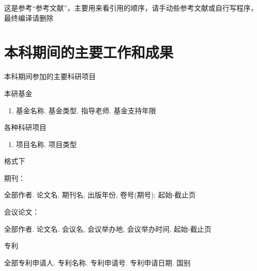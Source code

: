 \documentclass[UTF8,openany,AutoFakeBold,AutoFakeSlant,cs4size]{ctexbook}
\begin{document}
{
	\fancyhf{}
	\fancyfoot[CO,CE]{~\thepage~}
	\renewcommand{\headrulewidth}{0.7pt}
	\renewcommand{\footrulewidth}{0pt}
}
\fancyhf{}
\fancyfoot[CO,CE]{~\thepage~}
\renewcommand{\headrulewidth}{0.7pt}
\renewcommand{\footrulewidth}{0pt}








这是参考“参考文献”，主要用来看引用的顺序，请手动些参考文献或自行写程序，最终编译请删除
\clearpage





\linespread{1}\selectfont
\normalsize
\chapter*{本科期间的主要工作和成果}

\noindent 本科期间参加的主要科研项目

\noindent 本研基金
\begin{enumerate}
	\item 基金名称. 基金类型. 指导老师. 基金支持年限
\end{enumerate}

\noindent 各种科研项目
\begin{enumerate}
	\item 项目名称. 项目类型
\end{enumerate}

格式下

期刊：

全部作者. 论文名. 期刊名, 出版年份, 卷号(期号): 起始-截止页

会议论文：

全部作者. 论文名. 会议名, 会议举办地, 会议举办时间, 起始-截止页

专利

全部专利申请人. 专利名称. 专利申请号. 专利申请日期. 国别



{
	\fancyhf{}
	\fancyfoot[CO,CE]{~\thepage~}
	\renewcommand{\headrulewidth}{0.7pt}
	\renewcommand{\footrulewidth}{0pt}
}
\fancyhf{}
\fancyfoot[CO,CE]{~\thepage~}
\renewcommand{\headrulewidth}{0.7pt}
\renewcommand{\footrulewidth}{0pt}
\clearpage
\end{document}
